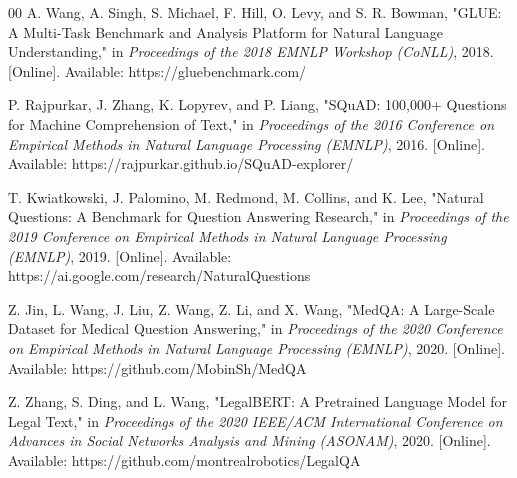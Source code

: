 \documentclass[conference]{IEEEtran}
\begin{document}
\begin{thebibliography}{00}
 A. Wang, A. Singh, S. Michael, F. Hill, O. Levy, and S. R. Bowman, "GLUE: A Multi-Task Benchmark and Analysis Platform for Natural Language Understanding," in \textit{Proceedings of the 2018 EMNLP Workshop (CoNLL)}, 2018. [Online]. Available: https://gluebenchmark.com/

 P. Rajpurkar, J. Zhang, K. Lopyrev, and P. Liang, "SQuAD: 100,000+ Questions for Machine Comprehension of Text," in \textit{Proceedings of the 2016 Conference on Empirical Methods in Natural Language Processing (EMNLP)}, 2016. [Online]. Available: https://rajpurkar.github.io/SQuAD-explorer/

 T. Kwiatkowski, J. Palomino, M. Redmond, M. Collins, and K. Lee, "Natural Questions: A Benchmark for Question Answering Research," in \textit{Proceedings of the 2019 Conference on Empirical Methods in Natural Language Processing (EMNLP)}, 2019. [Online]. Available: https://ai.google.com/research/NaturalQuestions

 Z. Jin, L. Wang, J. Liu, Z. Wang, Z. Li, and X. Wang, "MedQA: A Large-Scale Dataset for Medical Question Answering," in \textit{Proceedings of the 2020 Conference on Empirical Methods in Natural Language Processing (EMNLP)}, 2020. [Online]. Available: https://github.com/MobinSh/MedQA

 Z. Zhang, S. Ding, and L. Wang, "LegalBERT: A Pretrained Language Model for Legal Text," in \textit{Proceedings of the 2020 IEEE/ACM International Conference on Advances in Social Networks Analysis and Mining (ASONAM)}, 2020. [Online]. Available: https://github.com/montrealrobotics/LegalQA

\end{thebibliography}
\end{document}
